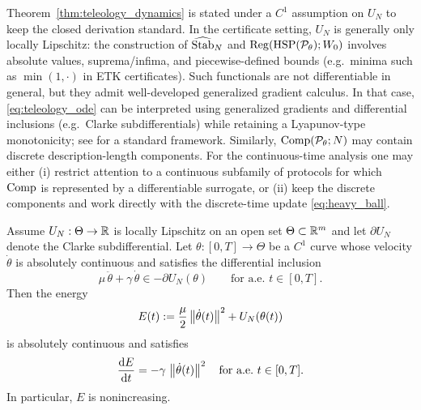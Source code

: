 \begin{remark}
Theorem~\ref{thm:teleology_dynamics} is stated under a $C^1$ assumption on $U_N$ to keep the closed derivation standard.
In the certificate setting, $U_N$ is generally only locally Lipschitz: the construction of $\widehat{\mathrm{Stab}}_N$ and $\mathrm{Reg}(\mathrm{HSP}(\mathcal{P}_\theta);W_0)$ involves absolute values, suprema/infima, and piecewise-defined bounds (e.g.\ minima such as $\min(1,\cdot)$ in ETK certificates).
Such functionals are not differentiable in general, but they admit well-developed generalized gradient calculus.
In that case, \eqref{eq:teleology_ode} can be interpreted using generalized gradients and differential inclusions (e.g.\ Clarke subdifferentials) while retaining a Lyapunov-type monotonicity; see \cite{Clarke1990} for a standard framework.
Similarly, $\mathrm{Comp}(\mathcal{P}_\theta;N)$ may contain discrete description-length components.
For the continuous-time analysis one may either (i) restrict attention to a continuous subfamily of protocols for which $\mathrm{Comp}$ is represented by a differentiable surrogate, or (ii) keep the discrete components and work directly with the discrete-time update \eqref{eq:heavy_ball}.
\end{remark}

\begin{proposition}
\label{prop:nonsmooth_energy}
Assume $U_N:\Theta\to\mathbb{R}$ is locally Lipschitz on an open set $\Theta\subset\mathbb{R}^m$ and let $\partial U_N$ denote the Clarke subdifferential.
Let $\theta:[0,T]\to\Theta$ be a $C^1$ curve whose velocity $\dot\theta$ is absolutely continuous and satisfies the differential inclusion
\begin{equation}
\label{eq:teleology_inclusion}
\mu\,\ddot\theta+\gamma\,\dot\theta \in -\partial U_N(\theta)
\qquad\text{for a.e.\ }t\in[0,T].
\end{equation}
Then the energy
\[
E(t):=\frac{\mu}{2}\left\lVert \dot\theta(t)\right\rVert^2+U_N(\theta(t))
\]
is absolutely continuous and satisfies
\[
\frac{\mathrm{d} E}{\mathrm{d} t}=-\gamma\,\left\lVert \dot\theta(t)\right\rVert^2
\quad\text{for a.e.\ }t\in[0,T].
\]
In particular, $E$ is nonincreasing.
\end{proposition}

